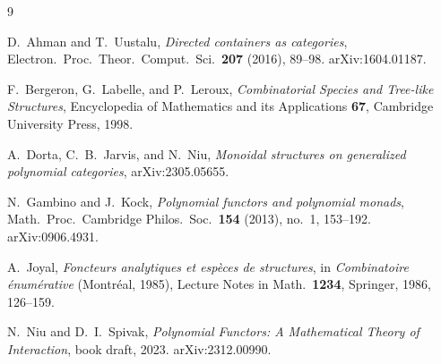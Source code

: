 \documentclass[11pt]{amsart}
\theoremstyle{plain}
\theoremstyle{definition}
\begin{document}
\begin{thebibliography}{9}

D.~Ahman and T.~Uustalu,
\emph{Directed containers as categories},
Electron.\ Proc.\ Theor.\ Comput.\ Sci.\ \textbf{207} (2016), 89--98.
arXiv:1604.01187.

F.~Bergeron, G.~Labelle, and P.~Leroux,
\emph{Combinatorial Species and Tree-like Structures},
Encyclopedia of Mathematics and its Applications \textbf{67},
Cambridge University Press, 1998.

A.~Dorta, C.~B.~Jarvis, and N.~Niu,
\emph{Monoidal structures on generalized polynomial categories},
arXiv:2305.05655.

N.~Gambino and J.~Kock,
\emph{Polynomial functors and polynomial monads},
Math.\ Proc.\ Cambridge Philos.\ Soc.\ \textbf{154} (2013), no.~1, 153--192.
arXiv:0906.4931.

A.~Joyal,
\emph{Foncteurs analytiques et esp\`eces de structures},
in \emph{Combinatoire \'enum\'erative} (Montr\'eal, 1985),
Lecture Notes in Math.\ \textbf{1234}, Springer, 1986, 126--159.

N.~Niu and D.~I.~Spivak,
\emph{Polynomial Functors: A Mathematical Theory of Interaction},
book draft, 2023. arXiv:2312.00990.

\end{thebibliography}
\end{document}
